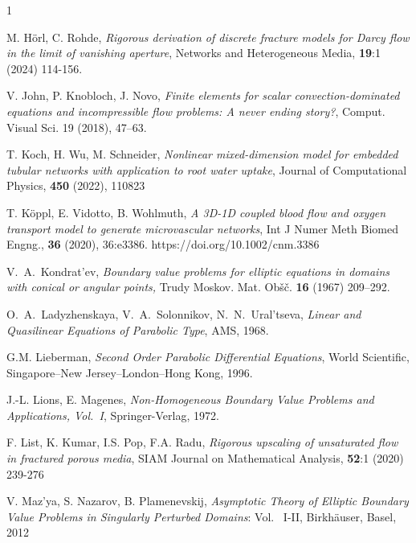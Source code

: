 \documentclass[reqno]{amsart}            %
\numberwithin{equation}{section}
\begin{document}
\begin{thebibliography}{1}
		
		M. H{\"o}rl, C. Rohde, \textit{Rigorous derivation of discrete fracture models for Darcy flow in the limit of vanishing aperture},
		{Networks and Heterogeneous Media}, \textbf{19}:1 (2024) 114-156.
		
		V. John, P. Knobloch, J. Novo, \textit{Finite elements for scalar convection-dominated equations and incompressible flow
			problems: A never ending story?}, Comput. Visual Sci. 19 (2018), 47–63.
		
		T. Koch, H. Wu, M. Schneider, \textit{Nonlinear mixed-dimension model for embedded tubular
			networks with application to root water uptake}, Journal of Computational Physics,  \textbf{450} (2022), 110823
		
		T. K\"oppl, E. Vidotto, B. Wohlmuth, \textit{A 3D-1D coupled blood flow and oxygen transport model to generate microvascular networks}, Int J Numer Meth Biomed Engng., \textbf{36} (2020), 36:e3386.
		https://doi.org/10.1002/cnm.3386
		
		
		V.~A.~Kondrat'ev, \textit{Boundary value problems for elliptic equations in domains with conical or angular points,}
		Trudy Moskov. Mat. Obšč. \textbf{16} (1967) 209--292.
		
		O.~A.~Ladyzhenskaya, V.~A.~Solonnikov, N.~N.~Ural'tseva, {\em Linear and Quasilinear Equations of Parabolic Type}, AMS, 1968.
		
		G.M. Lieberman, {\em Second Order Parabolic Differential Equations}, World Scientific, Singapore--New Jersey--London--Hong Kong,
		1996.
		
		J.-L. Lions,  E. Magenes, {\em Non-Homogeneous Boundary Value Problems and Applications, Vol.~I},
		Springer-Verlag, 1972.
		
		F. List, K. Kumar, I.S. Pop,  F.A. Radu, \textit{Rigorous upscaling of unsaturated flow in fractured porous media},
		SIAM Journal on Mathematical Analysis, \textbf{52}:1 (2020) 239-276
		
		
		V. Maz'ya, S. Nazarov, B. Plamenevskij, {\em Asymptotic Theory of Elliptic Boundary Value Problems in Singularly Perturbed Domains}: Vol.~ I-II, Birkhäuser, Basel, 2012  
		

\end{thebibliography}
\end{document}
